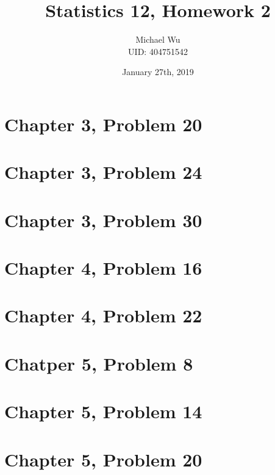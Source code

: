 \documentclass[12pt]{article}
\begin{document}
\title{Statistics 12, Homework 2}
\date{January 27th, 2019}
\author{Michael Wu\\UID: 404751542}
\maketitle

\section*{Chapter 3, Problem 20}

\section*{Chapter 3, Problem 24}

\section*{Chapter 3, Problem 30}

\section*{Chapter 4, Problem 16}

\section*{Chapter 4, Problem 22}

\section*{Chatper 5, Problem 8}

\section*{Chapter 5, Problem 14}

\section*{Chapter 5, Problem 20}
\end{document}

